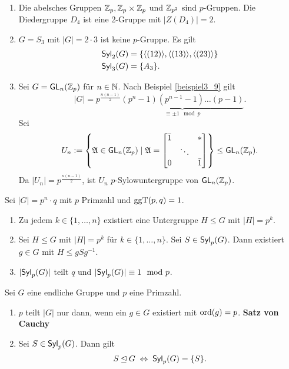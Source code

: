 \begin{beispiel}\label{beispiel3_12}
	\begin{enumerate}[label=(\arabic*)]
		\item Die abelsches Gruppen $\mathbb{Z}_p, \mathbb{Z}_p \times \mathbb{Z}_p$ und $\mathbb{Z}_{p^2}$ sind $p$-Gruppen. Die Diedergruppe $D_4$ ist eine 2-Gruppe mit $|Z(D_4)| = 2$.
		\item $G = S_3$ mit $|G| = 2 \cdot 3$ ist keine $p$-Gruppe. Es gilt
		\begin{align*}
			\mathsf{Syl}_2(G) &= \{\langle (12) \rangle, \langle (13) \rangle, \langle (23) \rangle\}\\
			\mathsf{Syl}_3(G) &= \{A_3\}.
		\end{align*}
		\item Sei $G = \mathsf{GL}_n(\mathbb{Z}_p)$ für $n \in \mathbb{N}$. Nach Beispiel \ref{beispiel3_9} gilt
		\[|G| = p^{\frac{n(n-1)}{2}} \underbrace{(p^n - 1)(p^{n-1} - 1) \dots (p-1)}_{\equiv \pm 1 \mod p}.\]
		Sei 
		\[U_n := \left\{\mathfrak{A} \in \mathsf{GL}_n(\mathbb{Z}_p) \mid \mathfrak{A} = \begin{bmatrix}
			\bar{1} & & * \\
			& \ddots &\\
			0 & & \bar{1}
		\end{bmatrix}\right\} \leq \mathsf{GL}_n(\mathbb{Z}_p).\]
		Da $|U_n| = p^{\frac{n(n-1)}{2}}$, ist $U_n$ $p$-Sylowuntergruppe von $\mathsf{GL}_n(\mathbb{Z}_p)$.
	\end{enumerate}
\end{beispiel}
\begin{thm}\label{thm3_13}
	Sei $|G| = p^n \cdot q$ mit $p$ Primzahl und $\mathrm{ggT}(p,q) = 1$.
	\begin{enumerate}[label=(\alph*)]
		\item Zu jedem $k \in \{1, \dots, n\}$ existiert eine Untergruppe $H \leq G$ mit $|H| = p^k$.
		\item Sei $H \leq G$ mit $|H| = p^k$ für $k \in \{1, \dots, n\}$. Sei $S \in \mathsf{Syl}_p(G)$. Dann existiert $g \in G$ mit $H \leq gSg^{-1}$.
		\item $|\mathsf{Syl}_p(G)|$ teilt $q$ und $|\mathsf{Syl}_p(G)| \equiv 1 \mod p$.
	\end{enumerate}
\end{thm}
\begin{kor}\label{kor3_14}
	Sei $G$ eine endliche Gruppe und $p$ eine Primzahl.
	\begin{enumerate}[label=(\alph*)]
		\item $p$ teilt $|G|$ nur dann, wenn ein $g \in G$ existiert mit $\mathrm{ord}(g) = p$. \textbf{Satz von Cauchy}
		\item Sei $S \in \mathsf{Syl}_p(G)$. Dann gilt
		\[S \unlhd G \;\Leftrightarrow\; \mathsf{Syl}_p(G) = \{S\}.\]
	\end{enumerate}
\end{kor}

